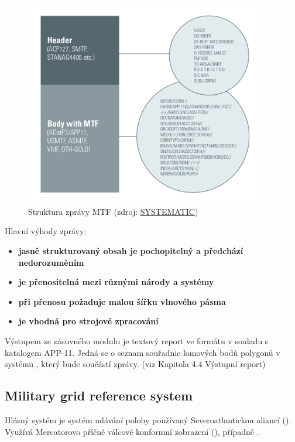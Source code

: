 \begin{figure}[H]
    \centering
      \includegraphics[width=300pt]{./pictures/Military-Messaging-white-borders-988px.png}
      \caption[Struktura zprávy MTF]{Struktura zprávy MTF
      (zdroj: \href{https://systematic.com/defence/products/a/military-messaging/app-11-and-adatp-3/}{SYSTEMATIC})}
      \label{fig:systematic}
  \end{figure}
  
Hlavní výhody  zprávy:

\begin{itemize}
	\item \textbf{jasně strukturovaný obsah je pochopitelný a předchází nedorozuměním} 
	\item \textbf{je přenositelná mezi různými národy a systémy} 
	\item \textbf{při přenosu požaduje malou šířku vlnového pásma}
	\item \textbf{je vhodná pro strojové zpracování}
\end{itemize}

Výstupem ze zásuvného modulu je textový report ve formátu v souladu s
katalogem APP-11. Jedná se o seznam souřadnic lomových bodů polygonů v
systému , který bude součástí  zprávy. (viz Kapitola
4.4 Výstupní report)

\subsection{Military grid reference system}

Hlásný systém  je systém udávání polohy používaný
Severoatlantickou aliancí (). Využívá Mercatorovo příčné
válcové konformní zobrazení (), případně .

